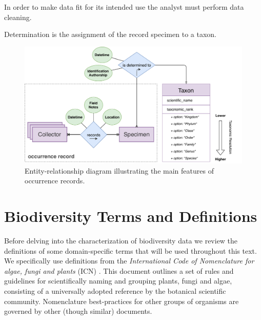 
In order to make data fit for its intended use the analyst must perform data cleaning.







Determination is the assignment of the record specimen to a taxon.

\begin{figure}[h!]
  	\centering
    \includegraphics[width=\linewidth]{figures/collections_data/occurrences_er.pdf}
    \caption{Entity-relationship diagram illustrating the main features of occurrence records.}
    \label{fig:er_occurrences}
\end{figure}


\section{Biodiversity Terms and Definitions}
Before delving into the characterization of biodiversity data we review the definitions of some domain-specific terms that will be used throughout this text. 
We specifically use definitions from the \textit{International Code of Nomenclature for algae, fungi and plants} (ICN) \cite{McNeill2012}. This document outlines a set of rules and guidelines for scientifically naming and grouping plants, fungi and algae, consisting of a universally adopted reference by the botanical scientific community. Nomenclature best-practices for other groups of organisms are governed by other (though similar) documents.

